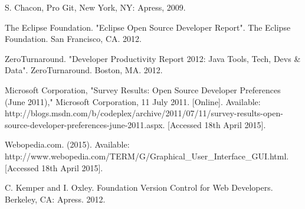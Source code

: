\documentclass[12pt,a4paper,article,compsoc]{IEEEtran}
\begin{document}
\begin{thebibliography}{1}
			S. Chacon, Pro Git, New York, NY: Apress, 2009.
			
			The Eclipse Foundation. "Eclipse Open Source Developer Report". The Eclipse Foundation. San Francisco, CA. 2012.
			
			ZeroTurnaround. "Developer Productivity Report 2012: Java Tools, Tech, Devs \& Data". ZeroTurnaround. Boston, MA. 2012.
			
			Microsoft Corporation, "Survey Results: Open Source Developer Preferences (June 2011)," Microsoft Corporation, 11 July 2011. [Online]. Available: http://blogs.msdn.com/b/codeplex/archive/2011/07/11/survey-results-open-source-developer-preferences-june-2011.aspx. [Accessed 18th April 2015].
			
			Webopedia.com. (2015). Available: http://www.webopedia.com/TERM/G/Graphical\_User\_Interface\_GUI.html. [Accessed 18th April 2015].
			
			C. Kemper and I. Oxley. Foundation Version Control for Web Developers. Berkeley, CA: Apress. 2012.
			
		\end{thebibliography}
\end{document}
